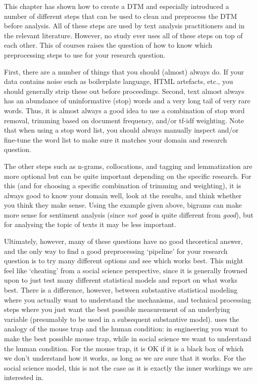This chapter has shown how to create a DTM and especially introduced a number of different steps that can be used to clean and preprocess the DTM before analysis.
All of these steps are used by text analysis practitioners and in the relevant literature.
However, no study ever uses all of these steps on top of each other.
This of courses raises the question of how to know which preprocessing steps to use for your research question.

First, there are a number of things that you should (almost) always do.
If your data contains noise such as boilerplate language, HTML artefacts, etc., you should generally strip these out before proceedings.
Second, text almost always has an abundance of uninformative (stop) words and a very long tail of very rare words.
Thus, it is almost always a good idea to use a combination of stop word removal, trimming based on document frequency, and/or tf-idf weighting.
Note that when using a stop word list, you should always manually inspect and/or fine-tune the word list to make sure it matches your domain and research question.

The other steps such as n-grams, collocations, and tagging and lemmatization are more optional but can be quite important depending on the specific research.
For this (and for choosing a specific combination of trimming and weighting), it is always good to know your domain well, look at the results, and think whether you think they make sense.
Using the example given above, bigrams can make more sense for sentiment analysis (since \emph{not good} is quite different from \emph{good}),
but for analysing the topic of texts it may be less important.

Ultimately, however, many of these questions have no good theoretical answer, and the only way to find a good preprocessing `pipeline' for your research question is to try many different
options and see which works best.
This might feel like `cheating' from a social science perspective, since it is generally frowned upon to just test many different statistical models and report on what works best.
There is a difference, however, between substantive statistical modeling where you actually want to understand the mechanisms,
and technical processing steps where you just want the best possible measurement of an underlying variable (presumably to be used in a subsequent substantive model).
\citet{mousetrap} uses the analogy of the mouse trap and the human condition: in engineering you want to make the best possible mouse trap, 
while in social science we want to understand the human condition.
For the mouse trap, it is OK if it is a black box of which we don't understand how it works, as long as we are sure that it works.
For the social science model, this is not the case as it is exactly the inner workings we are interested in.

